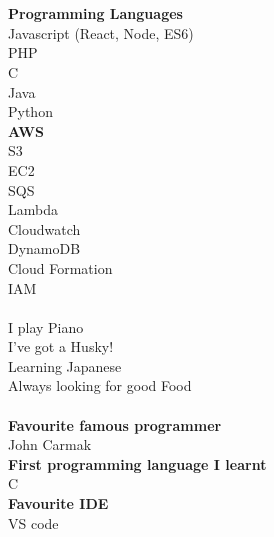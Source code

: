 \documentclass[8pt]{developercv}
\newcommand{\CC}{C\nolinebreak\hspace{-.05em}\raisebox{.4ex}{\tiny\bf +}\nolinebreak\hspace{-.10em}\raisebox{.4ex}{\tiny\bf +}}
\def\CC{{C\nolinebreak[4]\hspace{-.05em}\raisebox{.4ex}{\tiny\bf ++}}}
\begin{document}
	\begin{minipage}[t]{0.3\textwidth}		%
		
		\\
		\\\textbf{Programming Languages}\\
		{Javascript (React, Node, ES6)}\\
		{PHP}\\
		{\CC}\\
		{Java}\\
		{Python}\\
		
		\textbf{AWS}\\
		{S3}\\
		{EC2}\\
		{SQS}\\
		{Lambda}\\
		{Cloudwatch}\\
		{DynamoDB}\\
		{Cloud Formation}\\
		{IAM}\\
		
		\\
		{I play Piano}\\
		{I've got a Husky!}\\
		{Learning Japanese}\\
		{Always looking for good Food}\\
		
		\\
		{\textbf{Favourite famous programmer}}\\
		{John Carmak}\\
		{\textbf{First programming language I learnt}}\\
		{\CC}\\
		{\textbf{Favourite IDE}}\\
		{VS code}\\

	\end{minipage}
\end{document}
